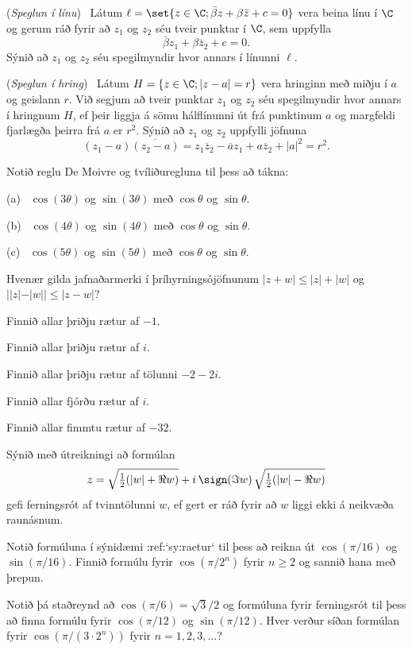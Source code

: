 \daemi ({\it Speglun í línu}) \ Látum $\ell=\set
{z\in \C;  \bar {\beta}z+{\beta}\bar
z+c=0}$ vera beina línu í $\C$ og gerum ráð fyrir að $z_1$ og
$z_2$ séu tveir punktar í $\C$, sem uppfylla 
$$
\bar {\beta} z_1+{\beta}\bar z_2+c=0.
$$
Sýnið að $z_1$ og $z_2$ séu spegilmyndir hvor annars í línunni $\ell$.

\daemi ({\it Speglun í hring}) \ Látum $H=\{z\in \C; |z-a|=r\}$ vera hringinn með miðju í
$a$ og geislann $r$.  Við segjum að tveir punktar $z_1$ og $z_2$ séu
spegilmyndir hvor annars í hringnum $H$, ef þeir liggja á sömu
hálflínunni út frá punktinum $a$ og margfeldi fjarlægða þeirra frá $a$
er $r^2$.  Sýnið að $z_1$ og $z_2$ uppfylli jöfnuna
$$
(z_1-a)\overline{(z_2-a)}=z_1\overline z_2-\overline a z_1+a\overline
z_2 +|a|^2=r^2.
$$

\daemi Notið reglu De Moivre og tvíliðuregluna 
til þess að tákna:

\smallskip\noindent
(a) \ 
$\cos(3\theta)$  
og $\sin (3\theta)$ með  $\cos\theta$ og $\sin \theta$.


\smallskip\noindent
(b) \ $\cos(4\theta)$  
og $\sin (4\theta)$ með  $\cos\theta$ og $\sin \theta$.

\smallskip\noindent
(c) \ $\cos(5\theta)$  
og $\sin (5\theta)$ með  $\cos\theta$ og $\sin \theta$.



\daemi Hvenær gilda jafnaðarmerki í þríhyrningsójöfnunum  
$|z+w| \leq  |z| + |w|$
og $||z|-|w||\leq |z-w|$?


\daemi Finnið allar þriðju rætur af $-1$.

\daemi Finnið allar þriðju rætur af $i$.

\daemi Finnið allar þriðju rætur af tölunni $-2-2i$.

\daemi Finnið allar fjórðu rætur af $i$.

\daemi Finnið allar fimmtu rætur af $-32$.


\daemi Sýnið með útreikningi að formúlan
$$
z=\sqrt{\tfrac 12(|w|+\Re w)}+i\, \sign(\Im w)\, \sqrt{\tfrac
12(|w|-\Re w)}
$$
gefi ferningsrót af tvinntölunni $w$, ef gert er ráð fyrir að 
$w$ liggi ekki á neikvæða raunásnum.


\daemi Notið formúluna í sýnidæmi :ref:`sy:raetur`
til þess að reikna út $\cos(\pi/16)$ og $\sin( \pi/16)$.
Finnið formúlu fyrir $\cos(\pi/2^n)$ fyrir $n\geq 2$ og sannið hana með
þrepun.

\daemi Notið þá staðreynd að $\cos(\pi/6)=\sqrt 3/2$ og formúluna fyrir ferningsrót
til þess að finna formúlu fyrir $\cos(\pi/12)$ og $\sin( \pi/12)$.
Hver verður síðan formúlan fyrir $\cos(\pi/(3\cdot 2^n))$ fyrir
$n=1,2,3,\dots$? 

